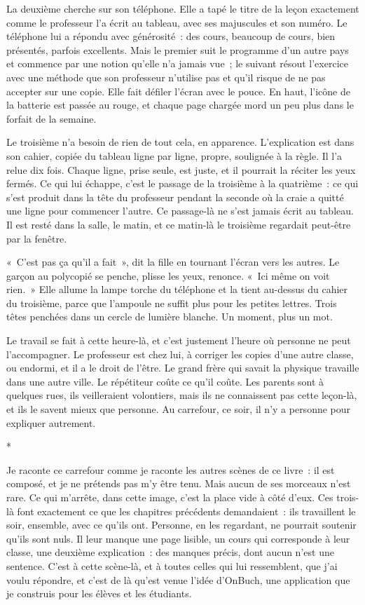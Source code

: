 \documentclass[10.5pt,twoside,openright]{book}
\newcommand{\asterisme}{\par\vspace{0.7em}\centerline{\color{gris}*\quad*\quad*}\vspace{0.7em}\par\noindent}
\begin{document}
La deuxième cherche sur son téléphone. Elle a tapé le titre de la leçon exactement comme le professeur l’a écrit au tableau, avec ses majuscules et son numéro. Le téléphone lui a répondu avec générosité : des cours, beaucoup de cours, bien présentés, parfois excellents. Mais le premier suit le programme d’un autre pays et commence par une notion qu’elle n’a jamais vue ; le suivant résout l’exercice avec une méthode que son professeur n’utilise pas et qu’il risque de ne pas accepter sur une copie. Elle fait défiler l’écran avec le pouce. En haut, l’icône de la batterie est passée au rouge, et chaque page chargée mord un peu plus dans le forfait de la semaine.

Le troisième n’a besoin de rien de tout cela, en apparence. L’explication est dans son cahier, copiée du tableau ligne par ligne, propre, soulignée à la règle. Il l’a relue dix fois. Chaque ligne, prise seule, est juste, et il pourrait la réciter les yeux fermés. Ce qui lui échappe, c’est le passage de la troisième à la quatrième : ce qui s’est produit dans la tête du professeur pendant la seconde où la craie a quitté une ligne pour commencer l’autre. Ce passage-là ne s’est jamais écrit au tableau. Il est resté dans la salle, le matin, et ce matin-là le troisième regardait peut-être par la fenêtre.

« C’est pas ça qu’il a fait », dit la fille en tournant l’écran vers les autres. Le garçon au polycopié se penche, plisse les yeux, renonce. « Ici même on voit rien. » Elle allume la lampe torche du téléphone et la tient au-dessus du cahier du troisième, parce que l’ampoule ne suffit plus pour les petites lettres. Trois têtes penchées dans un cercle de lumière blanche. Un moment, plus un mot.

Le travail se fait à cette heure-là, et c’est justement l’heure où personne ne peut l’accompagner. Le professeur est chez lui, à corriger les copies d’une autre classe, ou endormi, et il a le droit de l’être. Le grand frère qui savait la physique travaille dans une autre ville. Le répétiteur coûte ce qu’il coûte. Les parents sont à quelques rues, ils veilleraient volontiers, mais ils ne connaissent pas cette leçon-là, et ils le savent mieux que personne. Au carrefour, ce soir, il n’y a personne pour expliquer autrement.

\asterisme

Je raconte ce carrefour comme je raconte les autres scènes de ce livre : il est composé, et je ne prétends pas m’y être tenu. Mais aucun de ses morceaux n’est rare. Ce qui m’arrête, dans cette image, c’est la place vide à côté d’eux. Ces trois-là font exactement ce que les chapitres précédents demandaient : ils travaillent le soir, ensemble, avec ce qu’ils ont. Personne, en les regardant, ne pourrait soutenir qu’ils sont nuls. Il leur manque une page lisible, un cours qui corresponde à leur classe, une deuxième explication : des manques précis, dont aucun n’est une sentence. C’est à cette scène-là, et à toutes celles qui lui ressemblent, que j’ai voulu répondre, et c’est de là qu’est venue l’idée d’OnBuch, une application que je construis pour les élèves et les étudiants.
\end{document}
